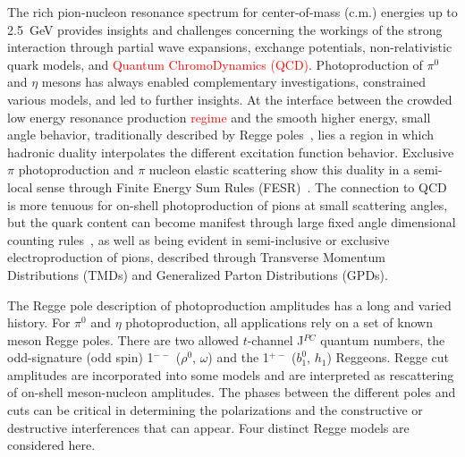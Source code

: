 \documentclass[aps,prc,twocolumn,floatfix,showpacs,preprintnumbers,amsmath,amssymb,superscriptaddress,linenumbers]{revtex4-1}
\begin{document}
The rich pion-nucleon resonance spectrum for center-of-mass 
(c.m.) energies up to 2.5~GeV provides insights and challenges concerning 
the workings of the strong interaction through partial wave expansions, 
exchange potentials, non-relativistic quark models, and \textcolor{red}{Quantum ChromoDynamics (QCD)}. 
Photoproduction of $\pi^0$ and $\eta$ mesons has always enabled complementary investigations, constrained 
various models, and led to further insights. At the interface between the crowded low energy resonance 
production \textcolor{red}{regime} and the smooth higher energy, small angle behavior, 
traditionally described by Regge poles~\cite{Ader:1967tqj}, lies a 
region in which hadronic duality interpolates the different excitation function
behavior. Exclusive $\pi$ photoproduction and $\pi$ nucleon elastic 
scattering show this duality in a semi-local sense through Finite Energy 
Sum Rules (FESR)~\cite{Armenian:1974xd}. The connection to QCD is more 
tenuous for on-shell photoproduction of pions at small scattering angles, 
but the quark content can become manifest through large fixed angle 
dimensional counting rules~\cite{Brodsky:1973kr}, as well as being evident 
in semi-inclusive or exclusive electroproduction of pions, described 
through Transverse Momentum Distributions (TMDs)  and Generalized Parton 
Distributions (GPDs).


The Regge pole description of photoproduction amplitudes 
has a long and varied history. For $\pi^0$ and $\eta$ photoproduction, 
all applications rely on a set of known meson Regge poles. There are 
two allowed $t$-channel J$^{PC}$ quantum numbers, the odd-signature (odd spin) 
1$^{--}$ ($\rho^0$, $\omega$) and the 1$^{+-}$ ($b^0_1$, $h_1$) Reggeons. Regge cut amplitudes are 
incorporated into some models and are interpreted as rescattering of 
on-shell meson-nucleon amplitudes.  The phases between the different 
poles and cuts can be critical in determining the polarizations and the 
constructive or destructive interferences that can appear. Four distinct Regge models 
are considered here.
\end{document}
